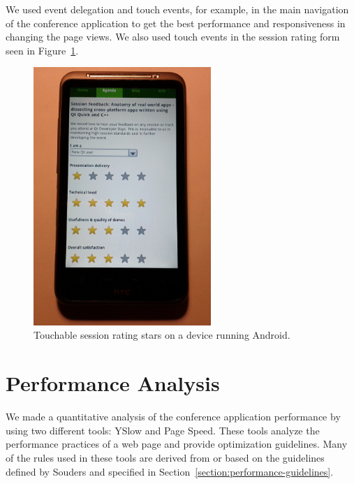 We used event delegation and touch events, for example, in the main
navigation of the conference application to get the best performance
and responsiveness in changing the page views. We also used touch
events in the session rating form seen in
Figure~\ref{figure:android-feedback-stars.jpg}.

\begin{figure}[ht]
  \begin{center}
    \includegraphics[width=0.6\textwidth]{images/android-feedback-stars.jpg}
    \caption{Touchable session rating stars on a device running Android.}
    \label{figure:android-feedback-stars.jpg}
  \end{center}
\end{figure}

\section{Performance Analysis}
\label{section:performance-analysis}

We made a quantitative analysis of the conference application
performance by using two different tools: YSlow and Page Speed. These
tools analyze the performance practices of a web page and provide
optimization guidelines. Many of the rules used in these tools are
derived from or based on the guidelines defined by Souders
\cite{souders2007high, souders2009even} and specified in
Section~\ref{section:performance-guidelines}.

